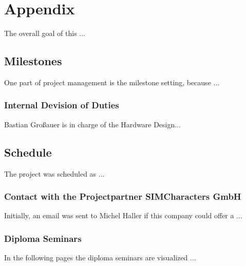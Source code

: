 \documentclass[12pt]{article}
\begin{document}

\clearpage




\section{Appendix}

The overall goal of this ...


\subsection{Milestones}

One part of project management is the milestone setting, because ...


\subsubsection{Internal Devision of Duties}

Bastian Großauer is in charge of the Hardware Design...

\subsection{Schedule}

The project was scheduled as ...


\subsubsection{Contact with the Projectpartner SIMCharacters GmbH}

Initially, an email was sent to Michel Haller if this company could offer a ...


\subsubsection{Diploma Seminars}

In the following pages the diploma seminars are visualized ...


\clearpage
\end{document}
